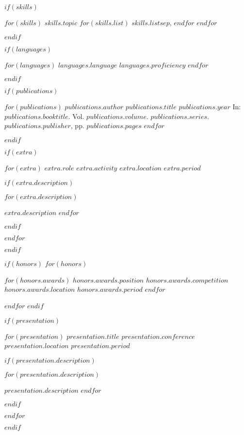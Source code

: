 \documentclass[11pt, a4paper]{awesome-cv}
\begin{document}
$if(skills)$
  \begin{cvskills}
    $for(skills)$
      \cvskill
      {$skills.topic$}
      {
        $for(skills.list)$
          $skills.list$$sep$,
        $endfor$
      }
    $endfor$
  \end{cvskills}
$endif$

$if(languages)$
  \begin{cvskills}
    $for(languages)$
      \cvskill
      {$languages.language$}
      {$languages.proficiency$}
    $endfor$
  \end{cvskills}
$endif$

$if(publications)$
  \begin{cventries}
    $for(publications)$
      \cventry
      {$publications.author$}
      {$publications.title$}
      {$publications.year$}
      {}
      {In: \emph{$publications.booktitle$}. Vol. $publications.volume$. $publications.series$. $publications.publisher$, pp. $publications.pages$}
    $endfor$
  \end{cventries}
$endif$

$if(extra)$
  \begin{cventries}
    $for(extra)$
      \cventry
      {$extra.role$}
      {$extra.activity$}
      {$extra.location$}
      {$extra.period$}
      {
        $if(extra.description)$
          \begin{cvitems}
            $for(extra.description)$
              \item{$extra.description$}
            $endfor$
          \end{cvitems}
        $endif$
      }
    $endfor$
  \end{cventries}
$endif$

$if(honors)$
  $for(honors)$
    \begin{cvhonors}
      $for(honors.awards)$
        \cvhonor
        {$honors.awards.position$}
        {$honors.awards.competition$}
        {$honors.awards.location$}
        {$honors.awards.period$}
      $endfor$
    \end{cvhonors}
  $endfor$
$endif$

$if(presentation)$
  \begin{cventries}
    $for(presentation)$
      \cventry
      {$presentation.title$}
      {$presentation.conference$}
      {$presentation.location$}
      {$presentation.period$}
      {
        $if(presentation.description)$
          \begin{cvitems}
            $for(presentation.description)$
              \item{$presentation.description$}
            $endfor$
          \end{cvitems}
        $endif$
      }
    $endfor$
  \end{cventries}
$endif$
\end{document}
